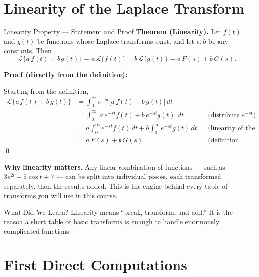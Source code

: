 \documentclass[12pt,a4paper]{article}
\begin{document}
\section{Linearity of the Laplace Transform}

\begin{infobox}{Linearity Property --- Statement and Proof}
\textbf{Theorem (Linearity).} Let $f(t)$ and $g(t)$ be functions whose Laplace
transforms exist, and let $a, b$ be any constants. Then
\[
  \mathcal{L}\{a\,f(t) + b\,g(t)\} = a\,\mathcal{L}\{f(t)\} + b\,\mathcal{L}\{g(t)\}
  = a\,F(s) + b\,G(s).
\]

\medskip
\textbf{Proof (directly from the definition):}

Starting from the definition,
\begin{align*}
  \mathcal{L}\{a\,f(t) + b\,g(t)\}
  &= \int_0^\infty e^{-st}\bigl[a\,f(t) + b\,g(t)\bigr]\, dt \\
  &= \int_0^\infty \bigl[a\,e^{-st} f(t) + b\,e^{-st} g(t)\bigr]\, dt
     && \text{(distribute $e^{-st}$)} \\
  &= a \int_0^\infty e^{-st} f(t)\, dt + b \int_0^\infty e^{-st} g(t)\, dt
     && \text{(linearity of the integral)} \\
  &= a\,F(s) + b\,G(s).
     && \text{(definition applied twice)}
\end{align*}
\qed

\medskip
\textbf{Why linearity matters.} Any linear combination of functions ---
such as $3e^{2t} - 5\cos t + 7$ --- can be split into individual pieces,
each transformed separately, then the results added. This is the engine
behind every table of transforms you will use in this course.
\end{infobox}

\begin{learnbox}{What Did We Learn?}
Linearity means ``break, transform, and add.'' It is the reason a short
table of basic transforms is enough to handle enormously complicated functions.
\end{learnbox}

\section{First Direct Computations}
\end{document}
